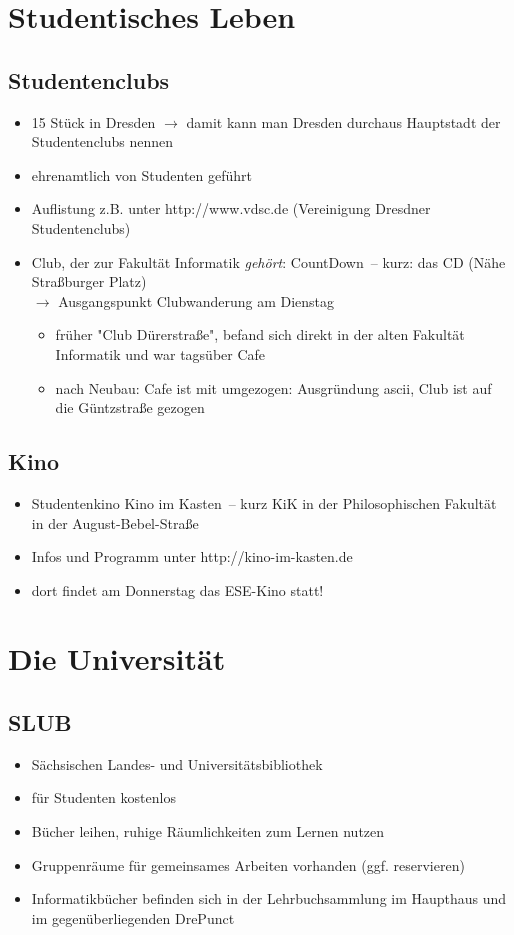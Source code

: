 \documentclass[a4paper,12pt]{report}
\begin{document}
\section{Studentisches Leben}

\subsection{Studentenclubs}
\begin{itemize}
	\item 15 Stück in Dresden $\rightarrow$ damit kann man Dresden durchaus Hauptstadt der Studentenclubs nennen
	\item ehrenamtlich von Studenten geführt
	\item  Auflistung z.B. unter http://www.vdsc.de (Vereinigung Dresdner Studentenclubs)
	\item Club, der zur Fakultät Informatik \textit{gehört}: \glqq CountDown\grqq\ -- kurz: das CD (Nähe Straßburger Platz)\\
	$\rightarrow$ Ausgangspunkt Clubwanderung am Dienstag
	\begin{itemize}
		\item früher "Club Dürerstraße", befand sich direkt in der alten Fakultät Informatik und war tagsüber Cafe
		\item nach Neubau: Cafe ist mit umgezogen: Ausgründung ascii, Club ist auf die Güntzstraße gezogen
	\end{itemize}
\end{itemize}

\subsection{Kino}
\begin{itemize}
	\item Studentenkino \glqq Kino im Kasten\grqq\ -- kurz KiK in der Philosophischen Fakultät in der August-Bebel-Straße
	\item Infos und Programm unter http://kino-im-kasten.de
	\item dort findet am Donnerstag das ESE-Kino statt!
\end{itemize}

\section{Die Universität}
\subsection{SLUB}
\begin{itemize}
	\item Sächsischen Landes- und Universitätsbibliothek
	\item für Studenten kostenlos
	\item Bücher leihen, ruhige Räumlichkeiten zum Lernen nutzen
	\item Gruppenräume für gemeinsames Arbeiten vorhanden (ggf. reservieren)
	\item Informatikbücher befinden sich in der Lehrbuchsammlung im Haupthaus und im gegenüberliegenden \glqq DrePunct\grqq
\end{itemize}
\end{document}
